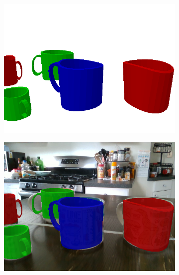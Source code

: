 \documentclass{article}
\begin{document}
\begin{figure}[]
\begin{subfigure}{(\linewidth - 0.05\linewidth)/5}
        \includegraphics[width=\linewidth]{figures/real2sim2real/6/3_sim.png}
    \end{subfigure}
    \begin{subfigure}{(\linewidth - 0.05\linewidth)/5}
        \centering
        \includegraphics[width=\linewidth]{figures/real2sim2real/6/3.png}
    \end{subfigure}
    \begin{subfigure}{(\linewidth - 0.05\linewidth)/5}
        \centering

\end{subfigure}
\end{figure}
\end{document}
